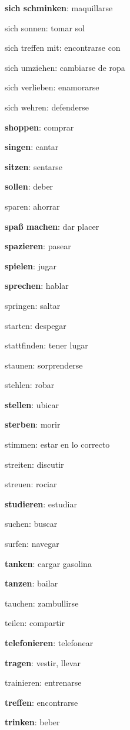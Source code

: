 \begin{multicols}{2}
\begin{myitemize}
\item \textbf{sich schminken}: maquillarse
\item sich sonnen: tomar sol
\item sich treffen mit: encontrarse con
\item sich umziehen: cambiarse de ropa
\item sich verlieben: enamorarse
\item sich wehren: defenderse
\item \textbf{shoppen}: comprar
\item \textbf{singen}: cantar
\item \textbf{sitzen}: sentarse
\item \textbf{sollen}: deber
\item sparen: ahorrar
\item \textbf{spaß machen}: dar placer
\item \textbf{spazieren}: pasear
\item \textbf{spielen}: jugar
\item \textbf{sprechen}: hablar
\item springen: saltar
\item starten: despegar
\item stattfinden: tener lugar
\item staunen: sorprenderse
\item stehlen: robar
\item \textbf{stellen}: ubicar
\item \textbf{sterben}: morir
\item stimmen: estar en lo correcto
\item streiten: discutir
\item streuen: rociar
\item \textbf{studieren}: estudiar
\item suchen: buscar
\item surfen: navegar
\item \textbf{tanken}: cargar gasolina
\item \textbf{tanzen}: bailar
\item tauchen: zambullirse
\item teilen: compartir
\item \textbf{telefonieren}: telefonear
\item \textbf{tragen}: vestir, llevar
\item trainieren: entrenarse
\item \textbf{treffen}: encontrarse
\item \textbf{trinken}: beber

\end{myitemize}
\end{multicols}
